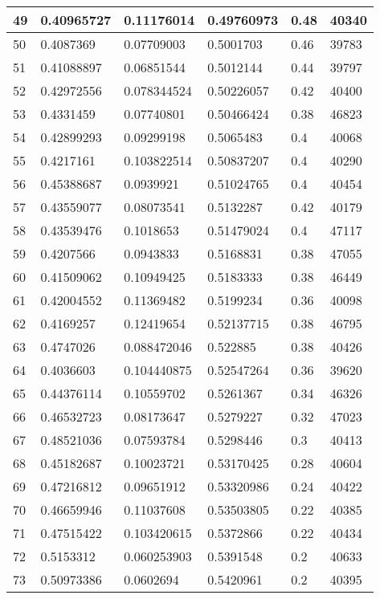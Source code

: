 \begin{longtable}{|l|l|l|l|l|l|}
49 & 0.40965727 & 0.11176014 & 0.49760973 & 0.48 & 40340 \\ \hline 
50 & 0.4087369 & 0.07709003 & 0.5001703 & 0.46 & 39783 \\ \hline 
51 & 0.41088897 & 0.06851544 & 0.5012144 & 0.44 & 39797 \\ \hline 
52 & 0.42972556 & 0.078344524 & 0.50226057 & 0.42 & 40400 \\ \hline 
53 & 0.4331459 & 0.07740801 & 0.50466424 & 0.38 & 46823 \\ \hline 
54 & 0.42899293 & 0.09299198 & 0.5065483 & 0.4 & 40068 \\ \hline 
55 & 0.4217161 & 0.103822514 & 0.50837207 & 0.4 & 40290 \\ \hline 
56 & 0.45388687 & 0.0939921 & 0.51024765 & 0.4 & 40454 \\ \hline 
57 & 0.43559077 & 0.08073541 & 0.5132287 & 0.42 & 40179 \\ \hline 
58 & 0.43539476 & 0.1018653 & 0.51479024 & 0.4 & 47117 \\ \hline 
59 & 0.4207566 & 0.0943833 & 0.5168831 & 0.38 & 47055 \\ \hline 
60 & 0.41509062 & 0.10949425 & 0.5183333 & 0.38 & 46449 \\ \hline 
61 & 0.42004552 & 0.11369482 & 0.5199234 & 0.36 & 40098 \\ \hline 
62 & 0.4169257 & 0.12419654 & 0.52137715 & 0.38 & 46795 \\ \hline 
63 & 0.4747026 & 0.088472046 & 0.522885 & 0.38 & 40426 \\ \hline 
64 & 0.4036603 & 0.104440875 & 0.52547264 & 0.36 & 39620 \\ \hline 
65 & 0.44376114 & 0.10559702 & 0.5261367 & 0.34 & 46326 \\ \hline 
66 & 0.46532723 & 0.08173647 & 0.5279227 & 0.32 & 47023 \\ \hline 
67 & 0.48521036 & 0.07593784 & 0.5298446 & 0.3 & 40413 \\ \hline 
68 & 0.45182687 & 0.10023721 & 0.53170425 & 0.28 & 40604 \\ \hline 
69 & 0.47216812 & 0.09651912 & 0.53320986 & 0.24 & 40422 \\ \hline 
70 & 0.46659946 & 0.11037608 & 0.53503805 & 0.22 & 40385 \\ \hline 
71 & 0.47515422 & 0.103420615 & 0.5372866 & 0.22 & 40434 \\ \hline 
72 & 0.5153312 & 0.060253903 & 0.5391548 & 0.2 & 40633 \\ \hline 
73 & 0.50973386 & 0.0602694 & 0.5420961 & 0.2 & 40395 \\ \hline 

\end{longtable}
